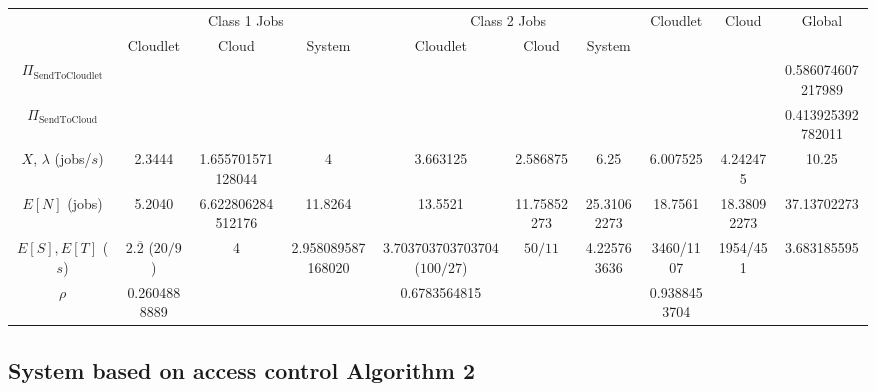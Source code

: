 \documentclass[10pt,a4paper]{article}
\begin{document}
\begin{table}[h!]
    \centering
    \small
    \begin{adjustbox}{width=1.5\textwidth,center=\textwidth}
     \begin{tabular}{c|c|c|c|c|c|c|c|c|c}

      \toprule
      
      & \multicolumn{3}{c|}{ Class 1 Jobs} & \multicolumn{3}{c|}{Class 2 Jobs} & \multirow{2}{*}{Cloudlet} & \multirow{2}{*}{Cloud} & \multirow{2}{*}{Global} \\ \cline{2-7}
      
      & Cloudlet & Cloud & System & Cloudlet & Cloud & System & \\
      \midrule
      $\Pi_{\text{SendToCloudlet}}$ & & & & & & & & & 0.586074607217989  \\
      \hline
      $\Pi_{\text{SendToCloud}}$ & & & & & & & & & 0.413925392782011  \\
      \hline
	  $X$, $\lambda$ (jobs/$s$) & 2.3444 & 1.655701571128044 & 4 & 3.663125 & 2.586875 & 6.25 & 6.007525 & 4.242475 & 10.25 \\     
      \hline
      $E[N]$ (jobs) & 5.2040 & 6.622806284512176 & 11.8264 & 13.5521 & 11.75852273 & 25.31062273 & 18.7561 & 18.38092273 & 37.13702273 \\
      \hline
      $E[S], E[T]$ ($s$)& $2.\overline{2}$ ($20/9$) & 4 & 2.958089587168020 & $3.703703703703704$ ($100/27$) & $50/11$ & 4.225763636 & 3460/1107 & 1954/451 & 3.683185595 \\
      \hline
	  $\rho$ & 0.2604888889 & & & 0.6783564815 & &  & 0.9388453704 & & \\
     
       
 
     
      \bottomrule

    \end{tabular}
    \end{adjustbox}
\end{table}



\newpage
\subsection{System based on access control Algorithm 2}
\end{document}
